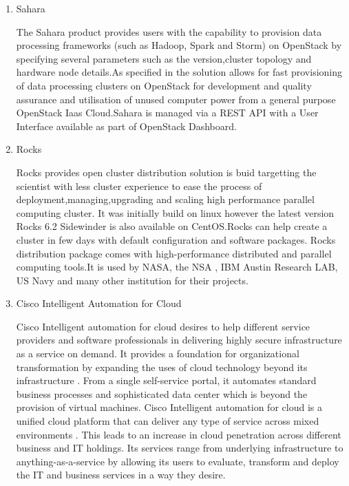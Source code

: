 \begin{enumerate}
\item {} 
Sahara

The Sahara product provides users with the capability to
provision data processing frameworks (such as Hadoop, Spark and
Storm) on OpenStack \label{\detokenize{i524/technologies:id593}}{\hyperref[\detokenize{i524/technologies:www-openstack}]{\sphinxcrossref{{[}511{]}}}} by specifying several
parameters such as the version,cluster topology and hardware node
details.As specified in \label{\detokenize{i524/technologies:id594}}{\hyperref[\detokenize{i524/technologies:www-sahara}]{\sphinxcrossref{{[}512{]}}}} the solution allows
for fast provisioning of data processing clusters on OpenStack
for development and quality assurance and utilisation of unused
computer power from a general purpose OpenStack Iaas Cloud.Sahara
is managed via a REST API with a User Interface available as part
of OpenStack Dashboard.

\item {} 
Rocks

\label{\detokenize{i524/technologies:id595}}{\hyperref[\detokenize{i524/technologies:www-rockscluster}]{\sphinxcrossref{{[}513{]}}}} Rocks provides open cluster distribution
solution is buid targetting the scientist with less cluster
experience to ease the process of deployment,managing,upgrading
and scaling high performance parallel computing cluster.  It was
initially build on linux however the latest version Rocks 6.2
Sidewinder is also available on CentOS.Rocks can help create a
cluster in few days with default configuration and software
packages.  Rocks distribution package comes with high-performance
distributed and parallel computing tools.It is used by NASA, the
NSA , IBM Austin Research LAB, US Navy and many other institution
for their projects.

\item {} 
Cisco Intelligent Automation for Cloud

Cisco Intelligent automation for cloud desires to help different
service providers and software professionals in delivering highly
secure infrastructure as a service on demand. It provides a
foundation for organizational transformation by expanding the
uses of cloud technology beyond its infrastructure
\label{\detokenize{i524/technologies:id596}}{\hyperref[\detokenize{i524/technologies:cis1}]{\sphinxcrossref{{[}514{]}}}}. From a single self-service portal, it automates
standard business processes and sophisticated data center which
is beyond the provision of virtual machines. Cisco Intelligent
automation for cloud is a unified cloud platform that can deliver
any type of service across mixed environments \label{\detokenize{i524/technologies:id597}}{\hyperref[\detokenize{i524/technologies:cis2}]{\sphinxcrossref{{[}515{]}}}}. This
leads to an increase in cloud penetration across different
business and IT holdings. Its services range from underlying
infrastructure to anything-as-a-service by allowing its users to
evaluate, transform and deploy the IT and business services in a
way they desire.


\end{enumerate}
